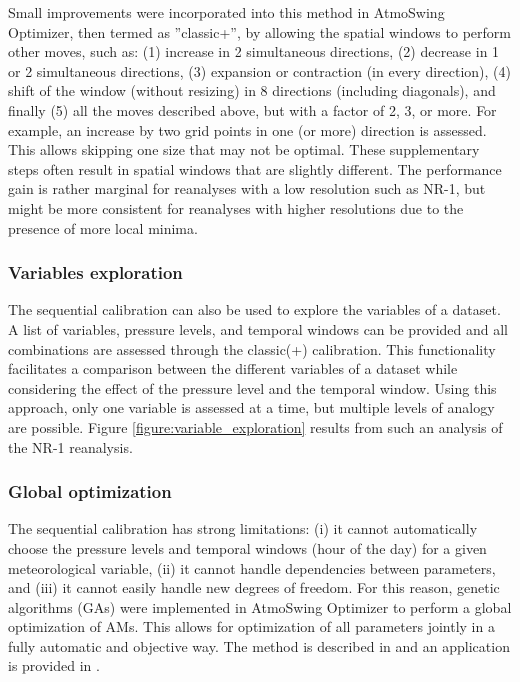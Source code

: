\documentclass[gmd]{copernicus}
\begin{document}
Small improvements were incorporated into this method in AtmoSwing Optimizer, then termed as ''classic+'', by allowing the spatial windows to perform other moves, such as: (1) increase in 2 simultaneous directions, (2) decrease in 1 or 2 simultaneous directions, (3) expansion or contraction (in every direction), (4) shift of the window (without resizing) in 8 directions (including diagonals), and finally (5) all the moves described above, but with a factor of 2, 3, or more. For example, an increase by two grid points in one (or more) direction is assessed. This allows skipping one size that may not be optimal. These supplementary steps often result in spatial windows that are slightly different. The performance gain is rather marginal for reanalyses with a low resolution such as NR-1, but might be more consistent for reanalyses with higher resolutions due to the presence of more local minima.


\subsubsection{Variables exploration}
\label{sec:vars-explo}

The sequential calibration can also be used to explore the variables of a dataset. A list of variables, pressure levels, and temporal windows can be provided and all combinations are assessed through the classic(+) calibration. This functionality facilitates a comparison between the different variables of a dataset while considering the effect of the pressure level and the temporal window. Using this approach, only one variable is assessed at a time, but multiple levels of analogy are possible. Figure \ref{figure:variable_exploration} results from such an analysis of the NR-1 reanalysis. 


\subsubsection{Global optimization}
\label{sec:global-optimization}

The sequential calibration has strong limitations: (i) it cannot automatically choose the pressure levels and temporal windows (hour of the day) for a given meteorological variable, (ii) it cannot handle dependencies between parameters, and (iii) it cannot easily handle new degrees of freedom. For this reason, genetic algorithms (GAs) were implemented in AtmoSwing Optimizer to perform a global optimization of AMs. This allows for optimization of all parameters jointly in a fully automatic and objective way. The method is described in \citet{Horton2017a} and an application is provided in \citet{Horton2018a}.
\end{document}
